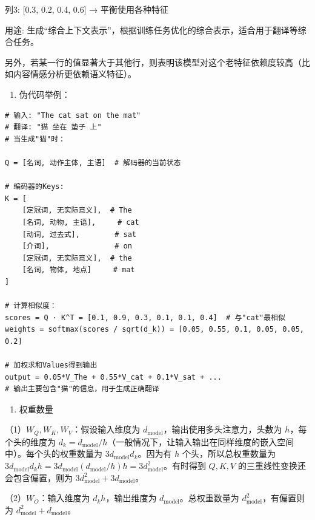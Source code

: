 列3: {[}0.3, 0.2, 0.4, 0.6{]} → 平衡使用各种特征

用途: 生成``综合上下文表示''，根据训练任务优化的综合表示，适合用于翻译等综合任务。

另外，若某一行的值显著大于其他行，则表明该模型对这个老特征依赖度较高（比如内容情感分析更依赖语义特征）。

\begin{enumerate}
\def\labelenumi{\arabic{enumi}.}
\setcounter{enumi}{4}
\tightlist
\item
{}
  伪代码举例：
\end{enumerate}

\begin{verbatim}
# 输入: "The cat sat on the mat"
# 翻译: "猫 坐在 垫子 上"
# 当生成"猫"时：

Q = [名词, 动作主体, 主语]  # 解码器的当前状态

# 编码器的Keys:
K = [
    [定冠词, 无实际意义],  # The
    [名词, 动物, 主语],     # cat
    [动词, 过去式],        # sat
    [介词],               # on
    [定冠词, 无实际意义],  # the
    [名词, 物体, 地点]     # mat
]

# 计算相似度：
scores = Q · K^T = [0.1, 0.9, 0.3, 0.1, 0.1, 0.4]  # 与"cat"最相似
weights = softmax(scores / sqrt(d_k)) = [0.05, 0.55, 0.1, 0.05, 0.05, 0.2]

# 加权求和Values得到输出
output = 0.05*V_The + 0.55*V_cat + 0.1*V_sat + ...
# 输出主要包含"猫"的信息，用于生成正确翻译
\end{verbatim}

\begin{enumerate}
\def\labelenumi{\arabic{enumi}.}
\setcounter{enumi}{5}
\tightlist
\item
  权重数量
\end{enumerate}

（1）\(W_Q,W_K,W_V\)：假设输入维度为 \(d_{\mathrm{model}}\)，输出使用多头注意力，头数为 \(h\)，每个头的维度为 \(d_k=d_{\mathrm{model}}/h\)（一般情况下，让输入输出在同样维度的嵌入空间中）。每个头的权重数量为 \(3d_{\mathrm{model}}d_k\)。因为有 \(h\) 个头，所以总权重数量为 \(3d_{\mathrm{model}}d_kh=3d_{\mathrm{model}}(d_{\mathrm{model}}/h)h=3d_{\mathrm{model}}^2\)。有时得到 \(Q,K,V\) 的三重线性变换还会包含偏置，则为 \(3d_{\mathrm{model}}^2+3d_{\mathrm{model}}\)。

（2）\(W_O\)：输入维度为 \(d_kh\)，输出维度为 \(d_{\mathrm{model}}\)。总权重数量为 \(d_{\mathrm{model}}^2\)，有偏置则为 \(d_{\mathrm{model}}^2+d_{\mathrm{model}}\)。

